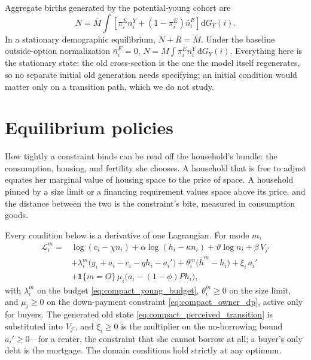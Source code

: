 \documentclass[11pt]{article}
\newcommand{\dd}{\mathrm d}
\newcommand{\1}{\mathbf 1}
\begin{document}
Aggregate births generated by the potential-young cohort are
\[
N
=
\bar M\int
\left[
\pi_i^E n_i^Y+(1-\pi_i^E)\bar n_i^E
\right]
\dd G_Y(i).
\]
In a stationary demographic equilibrium, $N+\bar R=\bar M$. Under the baseline outside-option normalization $\bar n_i^E=0$, $N=\bar M\int\pi_i^E n_i^Y\,\dd G_Y(i)$. Everything here is the stationary state: the old cross-section is the one the model itself regenerates, so no separate initial old generation needs specifying; an initial condition would matter only on a transition path, which we do not study.

\section{Equilibrium policies}

How tightly a constraint binds can be read off the household's bundle: the consumption, housing, and fertility she chooses. A household that is free to adjust equates her marginal value of housing space to the price of space. A household pinned by a size limit or a financing requirement values space above its price, and the distance between the two is the constraint's bite, measured in consumption goods.

Every condition below is a derivative of one Lagrangian. For mode $m$,
\begin{align*}
\mathcal L_i^m
={}&\log(c_i-\chi n_i)+\alpha\log(h_i-\kappa n_i)+\vartheta\log n_i
+\beta\,V_{j'}\\
&+\lambda_i^m\big(y_i+a_i-c_i-q h_i-a_i'\big)
+\theta_i^m\big(\bar h^m-h_i\big)
+\xi_i\,a_i'\\
&+\1\{m=O\}\,\mu_i\big(a_i-(1-\phi)P h_i\big),
\end{align*}
with $\lambda_i^m$ on the budget \eqref{eq:compact_young_budget}, $\theta_i^m\ge0$ on the size limit, and $\mu_i\ge0$ on the down-payment constraint \eqref{eq:compact_owner_dp}, active only for buyers. The generated old state \eqref{eq:compact_perceived_transition} is substituted into $V_{j'}$, and $\xi_i\ge0$ is the multiplier on the no-borrowing bound $a_i'\ge0$---for a renter, the constraint that she cannot borrow at all; a buyer's only debt is the mortgage. The domain conditions hold strictly at any optimum.
\end{document}
